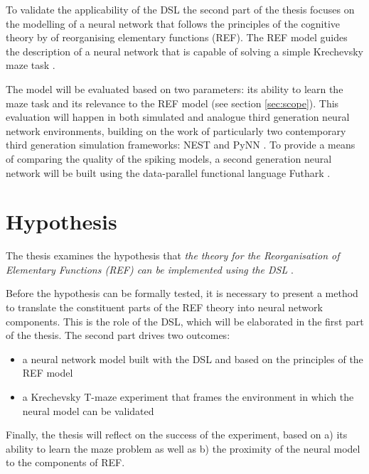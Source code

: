 \documentclass[report.tex]{subfiles}
\begin{document}
To validate the applicability of the \gls{DSL} the second part of 
the thesis focuses on the modelling of a neural network that follows
the principles of the cognitive theory by \textcite{Mogensen2011} of
reorganising elementary functions (\gls{REF}).
The \gls{REF} model guides the description of a neural network
that is capable of solving a simple Krechevsky maze task 
\autocite{Krechevsky1932}.

The model will be evaluated based on two parameters: 
its ability to  learn the maze task and its relevance to the 
\gls{REF} model (see section \ref{sec:scope}).
This evaluation will happen in both simulated and analogue
third generation neural network environments, building on the
work of particularly two contemporary third generation simulation
frameworks: NEST and PyNN \autocite{Davison2009}.
To provide a means of comparing the quality of the spiking models,
a second generation neural network will be built using the
data-parallel functional language Futhark \autocite{Henriksen2017}.

\section{Hypothesis}
The thesis examines the hypothesis that 
\textit{the theory for the Reorganisation of Elementary Functions
(\gls{REF}) can be implemented using the DSL }.

Before the hypothesis can be formally tested, it is necessary to
present a method to translate
the constituent parts of the \gls{REF} theory
into neural network components.
This is the role of the \gls{DSL}, which will be elaborated
in the first part of the thesis.
The second part drives two outcomes: 
\begin{itemize}
  \item a neural network model built with the 
    \gls{DSL} and based on the principles of the \gls{REF} model
  \item a Krechevsky T-maze experiment that frames the environment in
    which the neural model can be validated
\end{itemize}

Finally, the thesis will reflect on the success of the experiment, 
based on a) its ability to learn the maze problem as well as 
b) the proximity of the neural model to the components of \gls{REF}.
\end{document}
